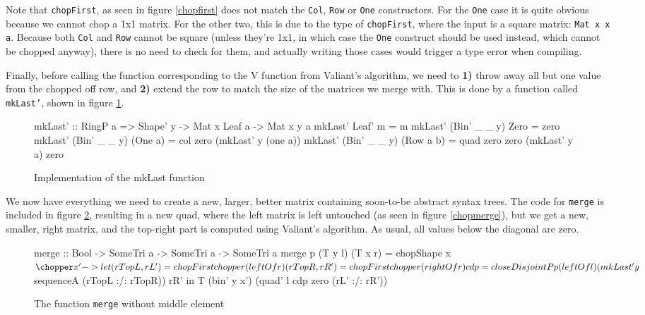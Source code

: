 \documentclass[a4paper,12pt,twosided]{report}
\begin{document}
Note that \texttt{chopFirst}, as seen in figure \ref{chopfirst} does not match
the \texttt{Col}, \texttt{Row} or \texttt{One} constructors. For the
\texttt{One} case it is quite obvious because we cannot chop a 1x1 matrix. For
the other two, this is due to the type of \texttt{chopFirst}, where the input is
a square matrix: \texttt{Mat x x a}. Because both \texttt{Col} and \texttt{Row}
cannot be square (unless they're 1x1, in which case the \texttt{One} construct
should be used instead, which cannot be chopped anyway), there is no need to
check for them, and actually writing those cases would trigger a type error when
compiling.

Finally, before calling the function corresponding to the V function from
Valiant's algorithm, we need to \textbf{1)} throw away all but one value from
the chopped off row, and \textbf{2)} extend the row to match the size of the
matrices we merge with. This is done by a function called \texttt{mkLast'},
shown in figure \ref{mklast}.

\begin{figure}[H]
\begin{code}
mkLast' :: RingP a => Shape' y -> Mat x Leaf a -> Mat x y a
mkLast' Leaf' m = m
mkLast' (Bin' _ _ y) Zero = zero
mkLast' (Bin' _ _ y) (One a) = col zero (mkLast' y (one a))
mkLast' (Bin' _ _ y) (Row a b) = quad zero zero (mkLast' y a) zero
\end{code}
\caption{\label{mklast}Implementation of the mkLast function}
\end{figure}

We now have everything we need to create a new, larger, better matrix containing
soon-to-be abstract syntax trees. The code for \texttt{merge} is included in
figure \ref{merge}, resulting in a new quad, where the left matrix is left
untouched (as seen in figure \ref{chopmerge}), but we get a new, smaller, right
matrix, and the top-right part is computed using Valiant's algorithm. As usual,
all values below the diagonal are zero.

\begin{figure}[H]
\begin{code}
merge :: Bool -> SomeTri a -> SomeTri a -> SomeTri a
merge p (T y l) (T x r) = chopShape x $ \chopper x' ->
    let (rTopL, rL') = chopFirst chopper (leftOf r)
        (rTopR, rR') = chopFirst chopper (rightOf r)
        cdp = closeDisjointP p (leftOf l) 
                (mkLast' y $ sequenceA (rTopL :/: rTopR)) rR'
    in T (bin' y x') (quad' l cdp zero (rL' :/: rR'))
\end{code}
\caption{The function \texttt{merge} without middle element}
\label{merge}
\end{figure}
\end{document}
